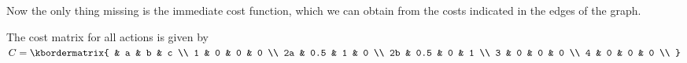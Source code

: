 \documentclass{article}
\begin{document}
Now the only thing missing is the immediate cost function, which we can obtain from
the costs indicated in the edges of the graph.

\medskip

The cost matrix for all actions is given by 
$
  C = \kbordermatrix{
    & a & b & c \\
    1 & 0 & 0 & 0 \\
    2a & 0.5 & 1 & 0 \\
    2b & 0.5 & 0 & 1 \\
    3 & 0 & 0 & 0 \\
    4 & 0 & 0 & 0 \\
  }
$

\medskip

\subsection{}
\end{document}
